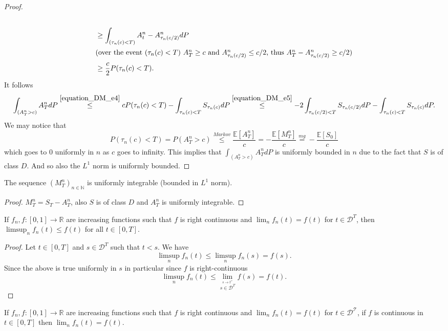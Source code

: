 \begin{proof}
\begin{align}
  \\
  &\geq \int_{(\tau_n(c)<T)}A^n_t-A^n_{\tau_n(c/2)}dP\nonumber
  \\
  \intertext{(over the event $(\tau_n(c)<T)$ $A^n_T\geq c$ and $A^n_{\tau_n(c/2)}\leq c/2$, thus $A^n_T-A^n_{\tau_n(c/2)}\geq c/2$)}
  &\geq \frac{c}{2}P(\tau_n(c)<T).\label{equation_DM_e5}
  \end{align}
  It follows
  $$
  \int_{(A^n_T>c)}A^n_TdP\stackrel{\eqref{equation_DM_e4}}{\leq}cP(\tau_n(c)<T)-\int_{\tau_n(c)<T}S_{\tau_n(c)}dP\stackrel{\eqref{equation_DM_e5}}{\leq}-2\int_{\tau_n(c/2)<T}S_{\tau_n(c/2)}dP-\int_{\tau_n(c)<T}S_{\tau_n(c)}dP.
  $$
  We may notice that
  $$
  P(\tau_n(c)<T)=P(A^n_T>c)\stackrel{Markov}{\leq}\frac{\mathbb{E}[A^n_T]}{c}=-\frac{\mathbb{E}[M^n_T]}{c}\stackrel{mg}{=}-\frac{\mathbb{E}[S_0]}{c}
  $$
  which goes to $0$ uniformly in $n$ as $c$ goes to infinity.
  This implies that $\int_{(A^n_T>c)}A^n_TdP$ is uniformly bounded in $n$ due to the fact that $S$ is of class $D$. And so also the $L^1$ norm is uniformly bounded.
\end{proof}


\begin{lemma}\label{lem:M_uniform_integrable}
  The sequence $(M^n_T)_{n\in\mathbb{N}}$ is uniformly integrable (bounded in $L^1$ norm).
\end{lemma}

\begin{proof}
  $M^n_T=S_T-A^n_T$, also $S$ is of class $D$ and $A^n_T$ is uniformly integrable.
\end{proof}


\begin{lemma}\label{lem:incr_fun_lim_right_cont_limsup_ineq}
  If $f_n, f : [0, 1] \rightarrow \mathbb{R}$ are increasing functions such that $f$ is right continuous and
  $\lim_n f_n(t) = f (t)$ for $t \in\mathcal{D}^T$, then  $\limsup_n  f_n(t) \leq f (t)$ for all $t \in [0, T]$.
\end{lemma}

\begin{proof}
  Let $t\in[0,T]$ and $s\in\mathcal{D}^T$ such that $t<s$. We have
  $$
  \limsup_n f_n(t)\leq \limsup_n f_n(s)=f(s).
  $$
  Since the above is true uniformly in $s$ in particular since $f$ is right-continuous
  $$
  \limsup_n f_n(t)\leq\lim_{\stackrel{s\rightarrow t^+}{s\in\mathcal{D}^T}}f(s)=f(t).
  $$
\end{proof}


\begin{lemma}\label{lem:incr_fun_lim_right_cont_lim_eq}
  If $f_n, f : [0, 1] \rightarrow \mathbb{R}$ are increasing functions such that $f$ is right continuous and
  $\lim_n f_n(t) = f (t)$ for $t \in\mathcal{D^T}$, if $f$ is continuous in $t\in[0,T]$ then $\lim_n  f_n(t) = f (t)$.
\end{lemma}

